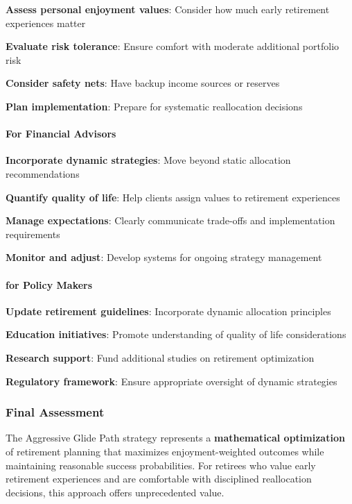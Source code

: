 \documentclass[11pt,letterpaper]{article}
\begin{document}
{{{{{{{{{{{\item \textbf{Assess personal enjoyment values}: Consider how much early retirement experiences matter
\item \textbf{Evaluate risk tolerance}: Ensure comfort with moderate additional portfolio risk
\item \textbf{Consider safety nets}: Have backup income sources or reserves
\item \textbf{Plan implementation}: Prepare for systematic reallocation decisions

\paragraph{For Financial Advisors}

\item \textbf{Incorporate dynamic strategies}: Move beyond static allocation recommendations
\item \textbf{Quantify quality of life}: Help clients assign values to retirement experiences
\item \textbf{Manage expectations}: Clearly communicate trade-offs and implementation requirements
\item \textbf{Monitor and adjust}: Develop systems for ongoing strategy management

\paragraph{for Policy Makers}

\item \textbf{Update retirement guidelines}: Incorporate dynamic allocation principles
\item \textbf{Education initiatives}: Promote understanding of quality of life considerations
\item \textbf{Research support}: Fund additional studies on retirement optimization
\item \textbf{Regulatory framework}: Ensure appropriate oversight of dynamic strategies

\subsubsection{Final Assessment}


The Aggressive Glide Path strategy represents a \textbf{mathematical optimization} of retirement planning that maximizes enjoyment-weighted outcomes while maintaining reasonable success probabilities. For retirees who value early retirement experiences and are comfortable with disciplined reallocation decisions, this approach offers unprecedented value.


}}}}}}}}}}}
\end{document}
